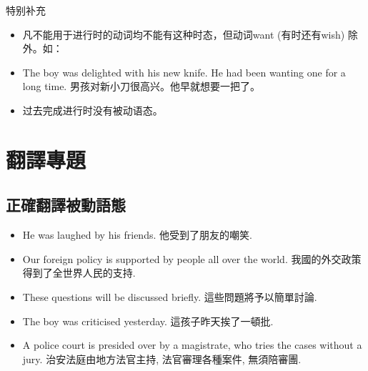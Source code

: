 特别补充
\begin{itemize}
  \itemsep0em
  \item 凡不能用于进行时的动词均不能有这种时态，但动词want (有时还有wish) 除外。如：
  \item The boy was delighted with his new knife. He had been wanting one for a long time. 男孩对新小刀很高兴。他早就想要一把了。
  \item 过去完成进行时没有被动语态。
\end{itemize}

\section{翻譯專題}
\subsection{正確翻譯被動語態}
\begin{itemize}
  \itemsep0em
  \item He was laughed  by his friends. 他受到了朋友的嘲笑.
  \item Our foreign policy is supported by people all over the world. 我國的外交政策得到了全世界人民的支持.
  \item These questions will be discussed briefly. 這些問題將予以簡單討論.
  \item The boy was criticised yesterday. 這孩子昨天挨了一頓批.
  \item A police court is presided over by a magistrate, who tries the cases without a jury. 治安法庭由地方法官主持, 法官審理各種案件, 無須陪審團.
\end{itemize}

